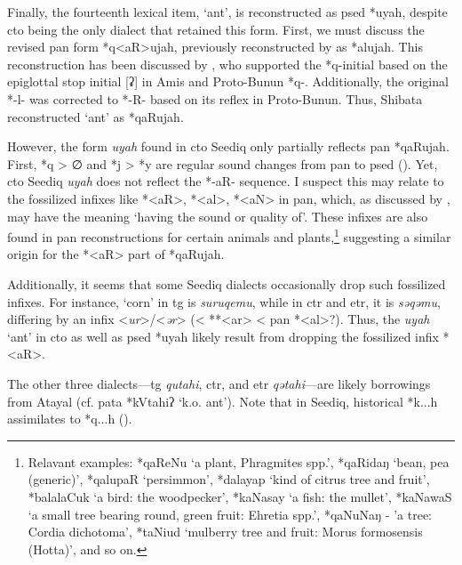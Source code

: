 
Finally, the fourteenth lexical item, `ant', is reconstructed as \acl{psed} *uyah, despite \acl{cto} being the only dialect that retained this form. First, we must discuss the revised \acs{pan} form *q<aR>ujah, previously reconstructed by \textcite{ACD} as *alujah. This reconstruction has been discussed by \textcite[146--47]{shibata2020pbun}, who supported the *q-initial based on the epiglottal stop initial [ʡ] in Amis and Proto-Bunun *q-. Additionally, the original *-l- was corrected to *-R- based on its reflex in Proto-Bunun. Thus, Shibata reconstructed `ant' as *qaRujah.

However, the form \textit{uyah} found in \acl{cto} Seediq only partially reflects \acs{pan} *qaRujah. First, *q > ∅ and *j > *y are regular sound changes from \acs{pan} to \acl{psed} (\cite{song2023Aicgprime,song2024sedq}). Yet, \acl{cto} Seediq \textit{uyah} does not reflect the *-aR- sequence. I suspect this may relate to the fossilized infixes like *<aR>, *<al>, *<aN> in \acl{pan}, which, as discussed by \textcite{li_tsuchida2009_AnInfixes}, may have the meaning `having the sound or quality of'. These infixes are also found in \acl{pan} reconstructions for certain animals and plants,\footnote{Relavant examples: *qaReNu `a plant, Phragmites spp.', *qaRidaŋ `bean, pea (generic)', *qalupaR `persimmon', *dalayap `kind of citrus tree and fruit', *balalaCuk `a bird: the woodpecker', *kaNasay `a fish: the mullet', *kaNawaS `a small tree bearing round, green fruit: Ehretia spp.', *qaNuNaŋ - 'a tree: Cordia dichotoma', *taNiud `mulberry tree and fruit: Morus formosensis (Hotta)', and so on.} suggesting a similar origin for the *<aR> part of *qaRujah. 

Additionally, it seems that some Seediq dialects occasionally drop such fossilized infixes. For instance, `corn' in \acl{tg} is \textit{suruqemu}, while in \acl{ctr} and \acl{etr}, it is \textit{səqəmu}, differing by an infix <\textit{ur}>/<\textit{ər}> (< **<ar> < \acs{pan} *<al>?). Thus, the \textit{uyah} `ant' in \acl{cto} as well as \acl{psed} *uyah likely result from dropping the fossilized infix *<aR>.

The other three dialects—\acl{tg} \textit{qutahi}, \acl{ctr}, and \acl{etr} \textit{qətahi}—are likely borrowings from Atayal (cf. \acl{pata} *kVtahiʔ `k.o. ant'). Note that in Seediq, historical *k...h assimilates to *q...h (\cite[247-48]{li1981paic}).

